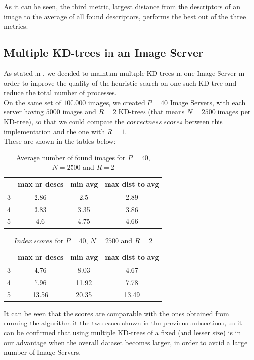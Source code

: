 As it can be seen, the third metric, largest distance from the descriptors of an image to the average of all found descriptors, performs the best out of the three metrics.\\

\subsection{Multiple KD-trees in an Image Server}

As stated in , we decided to maintain multiple KD-trees in one Image Server in order to improve the quality of the heuristic search on one such KD-tree and reduce the total number of processes.\\
On the same set of $100.000$ images, we created $P=40$ Image Servers, with each server having $5000$ images and $R=2$ KD-trees (that means $N=2500$ images per KD-tree), so that we could compare the $correctness\ scores$ between this implementation and the one with $R=1$.\\
These are shown in the tables below:\\

\begin{table}[H]
\centering
\begin{tabular} {c | c | c | c}
	& max nr descs & min avg & max dist to avg \\
	\hline
	3 & 2.86 & 2.5 & 2.89 \\
	\hline
	4 & 3.83 & 3.35 & 3.86 \\
	\hline
	5 & 4.6 & 4.75 & 4.66 \\
\end{tabular}
\caption{Average number of found images for $P=40$, $N=2500$ and $R=2$}
\end{table}

\begin{table}[H]
\centering
\begin{tabular} {c | c | c | c}
	& max nr descs & min avg & max dist to avg \\
	\hline
	3 & 4.76 & 8.03 & 4.67 \\
	\hline
	4 & 7.96 & 11.92 & 7.78 \\
	\hline
	5 & 13.56 & 20.35 & 13.49 \\
\end{tabular}
\caption{$Index\ scores$ for $P=40$, $N=2500$ and $R=2$}
\end{table}

It can be seen that the scores are comparable with the ones obtained from running the algorithm it the two cases shown in the previous subsections, so it can be confirmed that using multiple KD-trees of a fixed (and lesser size) is in our advantage when the overall dataset becomes larger, in order to avoid a large number of Image Servers.
 
